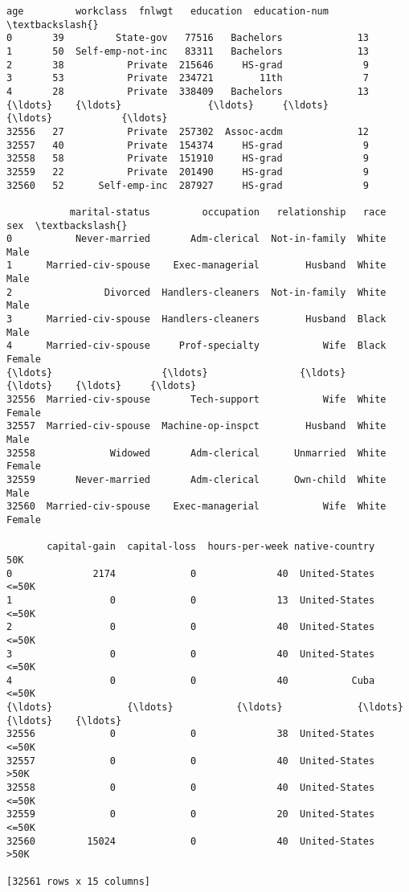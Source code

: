 \documentclass[11pt]{article}
\newcommand{\prompt}[4]{
        \llap{{\color{#2}[#3]: #4}}\vspace{-1.25em}
    }
\begin{document}
            \begin{tcolorbox}[breakable, boxrule=.5pt, size=fbox, pad at break*=1mm, opacityfill=0]
\prompt{Out}{outcolor}{2}{\hspace{3.5pt}}
\begin{Verbatim}[commandchars=\\\{\}]
       age         workclass  fnlwgt   education  education-num  \textbackslash{}
0       39         State-gov   77516   Bachelors             13
1       50  Self-emp-not-inc   83311   Bachelors             13
2       38           Private  215646     HS-grad              9
3       53           Private  234721        11th              7
4       28           Private  338409   Bachelors             13
{\ldots}    {\ldots}               {\ldots}     {\ldots}         {\ldots}            {\ldots}
32556   27           Private  257302  Assoc-acdm             12
32557   40           Private  154374     HS-grad              9
32558   58           Private  151910     HS-grad              9
32559   22           Private  201490     HS-grad              9
32560   52      Self-emp-inc  287927     HS-grad              9

           marital-status         occupation   relationship   race     sex  \textbackslash{}
0           Never-married       Adm-clerical  Not-in-family  White    Male
1      Married-civ-spouse    Exec-managerial        Husband  White    Male
2                Divorced  Handlers-cleaners  Not-in-family  White    Male
3      Married-civ-spouse  Handlers-cleaners        Husband  Black    Male
4      Married-civ-spouse     Prof-specialty           Wife  Black  Female
{\ldots}                   {\ldots}                {\ldots}            {\ldots}    {\ldots}     {\ldots}
32556  Married-civ-spouse       Tech-support           Wife  White  Female
32557  Married-civ-spouse  Machine-op-inspct        Husband  White    Male
32558             Widowed       Adm-clerical      Unmarried  White  Female
32559       Never-married       Adm-clerical      Own-child  White    Male
32560  Married-civ-spouse    Exec-managerial           Wife  White  Female

       capital-gain  capital-loss  hours-per-week native-country    50K
0              2174             0              40  United-States  <=50K
1                 0             0              13  United-States  <=50K
2                 0             0              40  United-States  <=50K
3                 0             0              40  United-States  <=50K
4                 0             0              40           Cuba  <=50K
{\ldots}             {\ldots}           {\ldots}             {\ldots}            {\ldots}    {\ldots}
32556             0             0              38  United-States  <=50K
32557             0             0              40  United-States   >50K
32558             0             0              40  United-States  <=50K
32559             0             0              20  United-States  <=50K
32560         15024             0              40  United-States   >50K

[32561 rows x 15 columns]
\end{Verbatim}
\end{tcolorbox}
        
\end{document}
